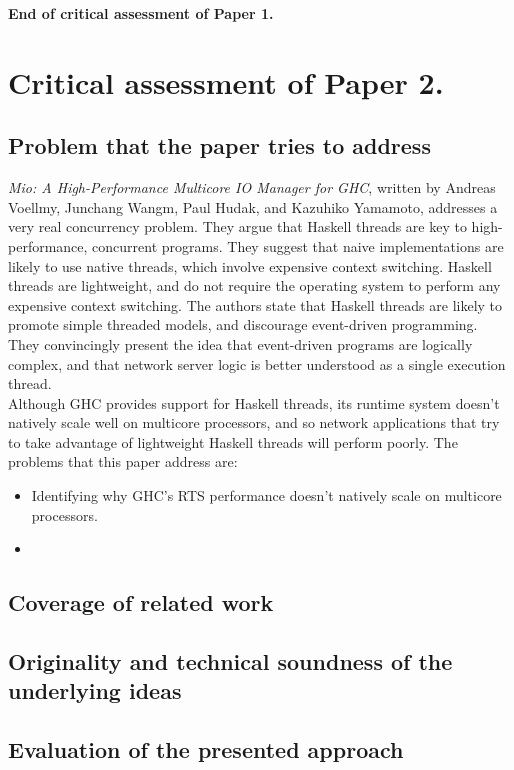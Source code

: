 \documentclass[9pt]{report}
\begin{document}
\noindent
{\bf End of critical assessment of Paper 1.}
\clearpage

\section*{Critical assessment of Paper 2.}
\subsection*{Problem that the paper tries to address}
{\it Mio: A High-Performance Multicore IO Manager for GHC}, written by Andreas Voellmy, Junchang Wangm, Paul Hudak, and Kazuhiko Yamamoto, addresses a very real concurrency problem.
They argue that Haskell threads are key to high-performance, concurrent programs.
They suggest that naive implementations are likely to use native threads, which involve expensive context switching.
Haskell threads are lightweight, and do not require the operating system to perform any expensive context switching.
The authors state that Haskell threads are likely to promote simple threaded models, and discourage event-driven programming.
They convincingly present the idea that event-driven programs are logically complex, and that network server logic is better understood as a single execution thread.\\

Although GHC provides support for Haskell threads, its runtime system doesn't natively scale well on multicore processors, and so network applications that try to take advantage of lightweight Haskell threads will perform poorly.
The problems that this paper address are:

\begin{itemize}
\item Identifying why GHC's RTS performance doesn't natively scale on multicore processors.
\item 
\end{itemize}

\subsection*{Coverage of related work}
\subsection*{Originality and technical soundness of the underlying ideas}
\subsection*{Evaluation of the presented approach}
\end{document}
